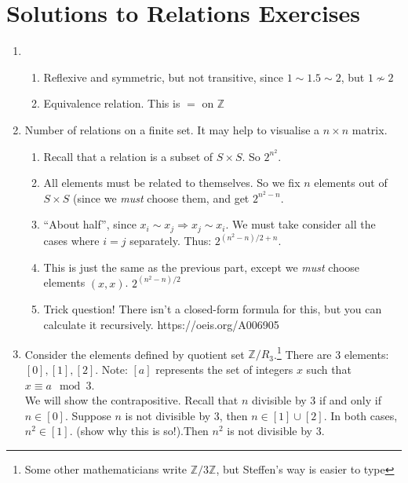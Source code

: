 \documentclass[10pt,a4paper]{article}
\begin{document}
\section{Solutions to Relations Exercises}
\begin{enumerate}
    \item
    \begin{enumerate}
        \item Reflexive and symmetric, but not transitive, since \( 1 \sim 1.5 \sim 2 \), but \( 1 \nsim 2 \)
        \item Equivalence relation. This is \( = \) on \( \mathbb{Z} \)
    \end{enumerate}

    \item Number of relations on a finite set. It may help to visualise a \( n \times n \) matrix.
    \begin{enumerate}
        \item Recall that a relation is a subset of \( S \times S \). So \( 2 ^ {n^2} \).
        \item All elements must be related to themselves. So we fix \( n \) elements out of \( S \times S \) (since we \emph{must} choose them, and get \( 2 ^ {n^2 - n}\).
        \item ``About half'', since \( x_i \sim x_j \Rightarrow x_j \sim x_i \). We must take consider all the cases where \( i = j \) separately. Thus: \( 2 ^ {(n^2 - n) / 2 + n}\).
        \item This is just the same as the previous part, except we \emph{must} choose elements \( (x, x) \). \(2 ^ {(n^2 - n) / 2}\)
        \item Trick question! There isn't a closed-form formula for this, but you can calculate it recursively. https://oeis.org/A006905
    \end{enumerate}

    \item Consider the elements defined by quotient set \( \mathbb{Z} / R_3 \).\footnote{Some other mathematicians write \( \mathbb{Z} / 3 \mathbb{Z} \), but Steffen's way is easier to type}
    There are 3 elements: \( [0], [1], [2] \). Note: \( [a] \) represents the set of integers \( x \) such that \( x \equiv a \mod 3 \). \\
    We will show the contrapositive.
    Recall that \( n \) divisible by 3 if and only if \( n \in [0] \). Suppose \( n \) is not divisible by 3, then \( n \in [1] \cup [2] \). In both cases, \( n^2 \in [1] \). (show why this is so!).Then \( n^2 \) is not divisible by 3.


\end{enumerate}
\end{document}
